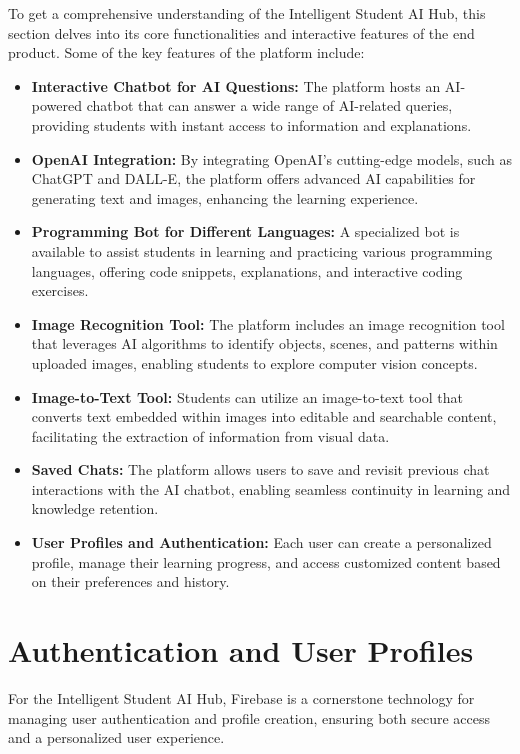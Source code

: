 To get a comprehensive understanding of the Intelligent Student AI Hub, this section delves into its core functionalities and interactive features of the end product.
Some of the key features of the platform include:
\begin{itemize}
    \item \textbf{Interactive Chatbot for AI Questions:} The platform hosts an AI-powered chatbot that can answer a wide range of AI-related queries, providing students with instant access to information and explanations.
    \item \textbf{OpenAI Integration:} By integrating OpenAI’s cutting-edge models, such as ChatGPT and DALL-E, the platform offers advanced AI capabilities for generating text and images, enhancing the learning experience.
    \item \textbf{Programming Bot for Different Languages:} A specialized bot is available to assist students in learning and practicing various programming languages, offering code snippets, explanations, and interactive coding exercises.
    \item \textbf{Image Recognition Tool:} The platform includes an image recognition tool that leverages AI algorithms to identify objects, scenes, and patterns within uploaded images, enabling students to explore computer vision concepts.
    \item \textbf{Image-to-Text Tool:} Students can utilize an image-to-text tool that converts text embedded within images into editable and searchable content, facilitating the extraction of information from visual data.
    \item \textbf{Saved Chats:} The platform allows users to save and revisit previous chat interactions with the AI chatbot, enabling seamless continuity in learning and knowledge retention.
    \item \textbf{User Profiles and Authentication:} Each user can create a personalized profile, manage their learning progress, and access customized content based on their preferences and history.
\end{itemize}


\section{Authentication and User Profiles}

For the Intelligent Student AI Hub, Firebase is a cornerstone technology for managing user authentication and profile creation, ensuring both secure access and a personalized user experience.

